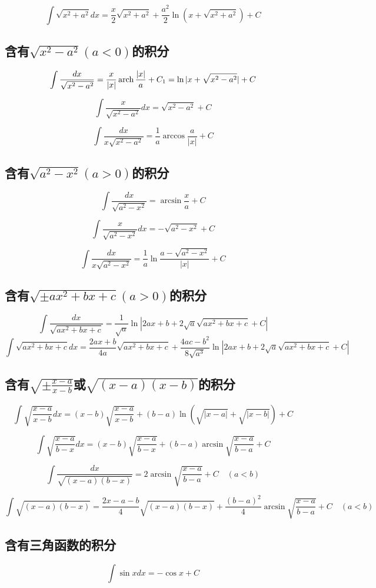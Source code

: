 $$
\int \sqrt{x^2+a^2}dx=\frac{x}{2}\sqrt{x^2+a^2}+\frac{a^2}{2}\ln(x+\sqrt{x^2+a^2})+C
$$

\subsection{含有$\sqrt{x^2-a^2}(a<0)$的积分}
$$
\int \frac{dx}{\sqrt{x^2-a^2}}=\frac{x}{|x|}\operatorname{arch} \frac{|x|}{a}+C_1=
\ln|x+\sqrt{x^2-a^2}|+C
$$

$$
\int \frac{x}{\sqrt{x^2-a^2}}dx=\sqrt{x^2-a^2}+C
$$

$$
\int \frac{dx}{x\sqrt{x^2-a^2}}=\frac{1}{a}\arccos \frac{a}{|x|}+C
$$

\subsection{含有$\sqrt{a^2-x^2}(a>0)$的积分}
$$
\int \frac{dx}{\sqrt{a^2-x^2}}=\arcsin \frac{x}{a}+C
$$

$$
\int \frac{x}{\sqrt{a^2-x^2}}dx=-\sqrt{a^2 - x^2}+C
$$

$$
\int \frac{dx}{x\sqrt{a^2-x^2}}=\frac{1}{a}\ln \frac{a-\sqrt{a^2 - x^2}}{|x|}+C
$$

\subsection{含有$\sqrt{\pm ax^2+bx+c}(a>0)$的积分}
$$
\int \frac{dx}{\sqrt{ax^2+bx+c}}=\frac{1}{\sqrt{a}}
\ln|2ax+b+2\sqrt{a}\sqrt{ax^2+bx+c}+C|
$$
$$
\int \sqrt{ax^2+bx+c}dx=\frac{2ax+b}{4a}\sqrt{ax^2+bx+c}+
\frac{4ac-b^2}{8\sqrt{a^3}}
\ln|2ax+b+2\sqrt{a}\sqrt{ax^2+bx+c}+C|
$$
\subsection{含有$\sqrt{\pm \frac{x-a}{x-b}}$或$\sqrt{(x-a)(x-b)}$的积分}
$$
\int \sqrt{\frac{x-a}{x-b}}dx=(x-b)\sqrt{\frac{x-a}{x-b}}+
(b-a)\ln (\sqrt{|x-a|}+\sqrt{|x-b|})+C
$$

$$
\int \sqrt{\frac{x-a}{b-x}}dx=(x-b)\sqrt{\frac{x-a}{b-x}}+
(b-a)\arcsin \sqrt{\frac{x-a}{b-a}}+C
$$

$$
\int \frac{dx}{\sqrt{(x-a)(b-x)}}=2\arcsin \sqrt{\frac{x-a}{b-a}}+C \quad(a<b)
$$

$$
\int \sqrt{(x-a)(b-x)}=\frac{2x-a-b}{4}\sqrt{(x-a)(b-x)}
+ \frac{(b-a)^2}{4}\arcsin \sqrt{\frac{x-a}{b-a}}+C \quad(a<b)
$$
\subsection{含有三角函数的积分}
$$
\int \sin xdx=-\cos x +C
$$

